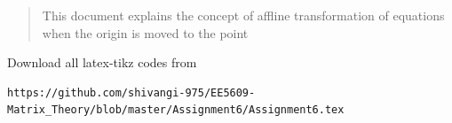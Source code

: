 \documentclass[journal,12pt,twocolumn]{IEEEtran}
\begin{document}
% 
\maketitle
\newpage
\bigskip
\renewcommand{\thefigure}{\theenumi}
\renewcommand{\thetable}{\theenumi}
%
%
\begin{abstract}
This document explains the concept of affline transformation of equations when the origin is moved to the point
\end{abstract}
Download all latex-tikz codes from 
%
\begin{lstlisting}
https://github.com/shivangi-975/EE5609-Matrix_Theory/blob/master/Assignment6/Assignment6.tex
\end{lstlisting}
%
\end{document}
